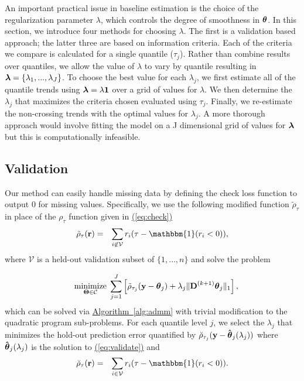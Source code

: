 \documentclass[aoas]{imsart}
\newcommand{\Eqn}[1]{\hyperref[eq:#1]{{\rm (\ref*{eq:#1})}}} %
\newcommand{\Alg}[1]{\hyperref[alg:#1]{Algorithm~\ref*{alg:#1}}} %
\newcommand{\Eqn}[1]{{(\ref{eq:#1})}} %
\newcommand{\Alg}[1]{{Algorithm~\ref{alg:#1}}} %
\newcommand{\One}{\mathbbm{1}}
\newcommand{\V}[1]{{\bm{\mathbf{\MakeLowercase{#1}}}}} %
\newcommand{\VE}[2]{\MakeLowercase{#1}_{#2}} %
\newcommand{\Vhat}[1]{{\bm{\hat \mathbf{\MakeLowercase{#1}}}}} %
\newcommand{\M}[1]{{\bm{\mathbf{\MakeUppercase{#1}}}}} %
\newcommand{\Mn}[2]{\M{#1}^{(#2)}} %
\begin{document}
An important practical issue in baseline estimation is the choice of the regularization parameter $\lambda$, which controls the degree of smoothness in $\V{\theta}$. In this section, we introduce four methods for choosing $\lambda$. The first is a validation based approach; the latter three are based on information criteria. Each of the criteria we compare is calculated for a single quantile ($\tau_j$). Rather than combine results over quantiles, we allow the value of $\lambda$ to vary by quantile resulting in $\V{\lambda} = \{\lambda_1, ..., \lambda_J\}$. To choose the best value for each $\lambda_j$, we first estimate all of the quantile trends using $\V{\lambda} = \lambda\mathbf{1}$ over a grid of values for $\lambda$. We then determine the $\lambda_j$ that maximizes the criteria chosen evaluated using $\tau_j$. Finally, we re-estimate the non-crossing trends with the optimal values for $\lambda_j$. A more thorough approach would involve fitting the model on a J dimensional grid of values for $\V{\lambda}$ but this is computationally infeasible.      

\subsection{Validation}
Our method can easily handle missing data by defining the check loss function to output 0 for missing values. %
Specifically, we use the following modified function $\tilde{\rho}_\tau$ in place of the $\rho_\tau$ function given in \Eqn{check}
\begin{eqnarray}
\label{eq:modcheck}
\tilde{\rho}_{\tau}(\V{r}) & = & \sum_{i \not\in \mathcal{V}} \VE{r}{i}(\tau-\One(\VE{r}{i}<0)),
\end{eqnarray}
where $\mathcal{V}$ is a held-out validation subset of $\{1, \ldots, n\}$ and solve the problem

\begin{eqnarray}
\label{eq:validate}
&&\underset{\M{\Theta} \in \mathcal{C}}{\text{minimize}}\; \sum_{j=1}^J \left [\tilde{\rho}_{\tau_j}(\V{y} - \V{\theta}_{j}) +
\lambda_j \lVert \Mn{D}{k+1} \V{\theta}_j \rVert_1 \right ],
\end{eqnarray}
which can be solved via \Alg{admm} with trivial modification to the quadratic program sub-problems. For each quantile level $j$, we select the $\lambda_j$ that minimizes the hold-out prediction error quantified by $\breve{\rho}_{\tau_j}(\V{y} - \Vhat{\theta}_j(\lambda_j))$ where $\Vhat{\theta}_j(\lambda_j)$ is the solution to \Eqn{validate} and
\begin{eqnarray*}
	\breve{\rho}_{\tau}(\V{r}) & = & \sum_{i \in \mathcal{V}} \VE{r}{i}(\tau-\One(\VE{r}{i}<0)).
\end{eqnarray*}
\end{document}
